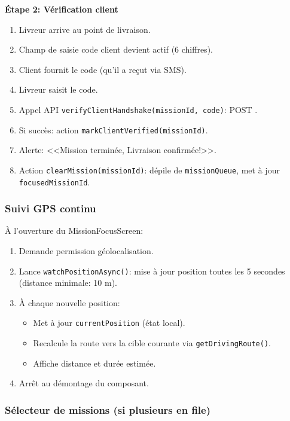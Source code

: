 \textbf{Étape 2: Vérification client}
\begin{enumerate}
    \item Livreur arrive au point de livraison.
    \item Champ de saisie code client devient actif (6 chiffres).
    \item Client fournit le code (qu'il a reçut via SMS).
    \item Livreur saisit le code.
    \item Appel API \texttt{verifyClientHandshake(missionId, code)}: POST .
    \item Si succès: action \texttt{markClientVerified(missionId)}.
    \item Alerte: <<Mission terminée, Livraison confirmée!>>.
    \item Action \texttt{clearMission(missionId)}: dépile de \texttt{missionQueue}, met à jour \texttt{focusedMissionId}.
\end{enumerate}

\subsubsection{Suivi GPS continu}

À l'ouverture du MissionFocusScreen:
\begin{enumerate}
    \item Demande permission géolocalisation.
    \item Lance \texttt{watchPositionAsync()}: mise à jour position toutes les 5 secondes (distance minimale: 10 m).
    \item À chaque nouvelle position:
    \begin{itemize}
        \item Met à jour \texttt{currentPosition} (état local).
        \item Recalcule la route vers la cible courante via \texttt{getDrivingRoute()}.
        \item Affiche distance et durée estimée.
    \end{itemize}
    \item Arrêt au démontage du composant.
\end{enumerate}

\subsubsection{Sélecteur de missions (si plusieurs en file)}

